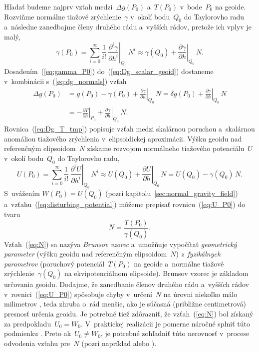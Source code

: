 \documentclass[a4paper, 12pt]{book}
\begin{document}
Hľadať budeme najprv vzťah medzi~$\Delta g(P_0)$ a~$T(P_0)$ v~bode~$P_0$ na 
geoide.  Rozviňme normálne tiažové zrýchlenie~$\gamma$ v~okolí bodu~$Q_0$ do 
Taylorovho radu a~následne zanedbajme členy druhého rádu a~vyšších rádov, 
pretože ich vplyv je malý,
%
\begin{equation}
\label{eq:gamma_P0}
\gamma(P_0) = \sum_{i = 0}^\infty \frac{1}{i!} \, \left.\frac{\partial^i 
\gamma}{\partial h^i}\right|_{Q_0} \, N^i \approx \gamma(Q_0) 
+ \left.\frac{\partial \gamma}{\partial h}\right|_{Q_0} \, N{.}
\end{equation}
%
Dosadením~(\ref{eq:gamma_P0}) do~(\ref{eq:Dg_scalar_geoid}) dostaneme 
v~kombinácii s~(\ref{eq:dg_normals}) vzťah
%
\begin{equation}
\label{eq:Dg_T_tmp}
\begin{split}
\Delta g(P_0) &= g(P_0) - \gamma(P_0) + \left.\frac{\partial \gamma}{\partial 
h}\right|_{Q_0} \, N = \delta g(P_0) + \left.\frac{\partial \gamma}{\partial 
h}\right|_{Q_0} \, N\\
%
&=-\left.\frac{\partial T}{\partial h}\right|_{P_0} + \left.\frac{\partial 
\gamma}{\partial h}\right|_{Q_0} \, N{.}
\end{split}
\end{equation}
%
Rovnica~(\ref{eq:Dg_T_tmp}) popisuje vzťah medzi skalárnou poruchou a~skalárnou 
anomáliou tiažového zrýchlenia v~elipsoidickej aproximácii.  Výšku geoidu nad 
referenčným elipsoidom~$N$ získame rozvojom normálneho tiažového potenciálu~$U$ 
v~okolí bodu~$Q_0$ do Taylorovho radu,
%
\begin{equation}
\label{eq:U_P0}
U(P_0) = \sum_{i = 0}^\infty \frac{1}{i!} \, \left.\frac{\partial^i U}{\partial 
h^i}\right|_{Q_0} \, N^i \approx U(Q_0) + \left.\frac{\partial U}{\partial 
h}\right|_{Q_0} \, N = U(Q_0) - \gamma(Q_0) \, N{.}
\end{equation}
%
S~uvážením $W(P_0) = U(Q_0)$ (pozri kapitolu~\ref{sec:normal_gravity_field}) 
a~vzťahu~(\ref{eq:disturbing_potential}) môžeme prepísať 
rovnicu~(\ref{eq:U_P0}) do tvaru
%
\begin{equation}
\label{eq:N}
N = \frac{T(P_0)}{\gamma(Q_0)}.
\end{equation}
%
Vzťah~(\ref{eq:N}) sa nazýva \emph{Brunsov vzorec} a~umožňuje vypočítať 
\emph{geometrický parameter} (výšku geoidu nad referenčným elipsoidom~$N$) 
\emph{z~fyzikálnych parametrov} (poruchový potenciál~$T(P_0)$ na geoide 
a~normálne tiažové zrýchlenie~$\gamma(Q_0)$ na ekvipotenciálnom elipsoide).  
Brunsov vzorec je základom určovania geoidu.  Dodajme, že zanedbanie členov 
druhého rádu a~vyšších rádov v~rovnici~(\ref{eq:U_P0}) spôsobuje chyby 
v~určení~$N$ na úrovni niekoľko málo milimetrov 
\parencite{Jekeli2015,Sjoberg2017}, teda zhruba o~rád menšie, ako je súčasná 
(približne centimetrová) presnosť určenia geoidu.  Je potrebné tiež zdôrazniť, 
že vzťah~(\ref{eq:N}) bol získaný za predpokladu~$U_0 = W_0$.  V~praktickej 
realizácii je pomerne náročné splniť túto podmienku 
\parencite{MoritzPhysicalGeodesy}.  Preto ak~$U_0 \neq W_0$, je potrebné 
zohľadniť túto nerovnosť v~procese odvodenia vzťahu pre~$N$ (pozri napríklad 
\cite{VanicekGeodesy} alebo \cite{MoritzPhysicalGeodesy}).
\end{document}
